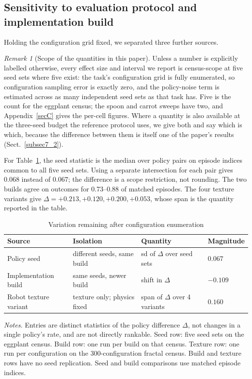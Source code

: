 \documentclass[pdflatex,iicol,sn-apa]{sn-jnl}
\theoremstyle{remark}
\newtheorem{remark}{Remark}
\newcommand{\tablenote}[1]{\par\vspace{4pt}\noindent
\begin{minipage}{\linewidth}\tablefootnotefont\raggedright #1\par\end{minipage}}
\begin{document}
\subsection{Sensitivity to evaluation protocol and implementation build}\label{subsec5_5}

Holding the configuration grid fixed, we separated three further sources.

\begin{remark}[Scope of the quantities in this paper]\label{rem:scope}
Unless a number is explicitly labelled otherwise, every effect size and interval we report is
census-scope at five seed sets where five exist: the task's configuration grid is fully enumerated,
so configuration sampling error is exactly zero, and the policy-noise term is estimated across as
many independent seed sets as that task has. Five is the count for the eggplant census; the spoon
and carrot sweeps have two, and Appendix~\ref{secC} gives the per-cell figures. Where a quantity is also available at the three-seed budget the reference protocol uses, we
give both and say which is which, because the difference between them is itself one of the paper's
results (Sect.~\ref{subsec7_2}).
\end{remark}

For Table~\ref{tab3}, the seed statistic is the median over policy pairs on episode indices common to all five seed sets. Using a separate intersection for each pair gives $0.068$ instead of $0.067$; the difference is a scope restriction, not rounding. The two builds agree on outcomes for 0.73--0.88 of matched episodes. The four texture variants give $\Delta = +0.213, +0.120, +0.200, +0.053$, whose span is the quantity reported in the table.

\begin{table}[t]
\caption{Variation remaining after configuration enumeration}\label{tab3}
\begin{tabular}{@{}llll@{}}
\toprule
Source & Isolation & Quantity & Magnitude \\
\midrule
Policy seed & different seeds, same build & sd of $\Delta$ over seed sets & $0.067$ \\
Implementation build & same seeds, newer build & shift in $\Delta$ & $-0.109$ \\
Robot texture variant & texture only; physics fixed & span of $\Delta$ over 4 variants & $0.160$ \\
\bottomrule
\end{tabular}
\tablenote{\textit{Notes.} Entries are distinct statistics of the policy difference $\Delta$, not changes in a single policy's rate, and are not directly rankable. Seed row: five seed sets on the eggplant census. Build row: one run per build on that census. Texture row: one run per configuration on the 300-configuration fractal census. Build and texture rows have no seed replication. Seed and build comparisons use matched episode indices.}
\end{table}
\end{document}
